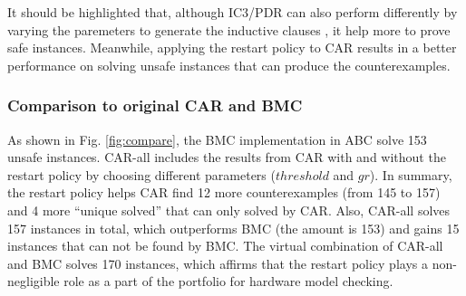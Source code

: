 It should be highlighted that, although IC3/PDR can also perform differently by varying the paremeters to generate the inductive clauses \cite{}, it help more to prove safe instances. Meanwhile, applying the restart policy to CAR results in a better performance on solving unsafe instances that can produce the counterexamples. 

\subsubsection{Comparison to original CAR and BMC }
As shown in Fig. \ref{fig:compare}, the BMC implementation in ABC solve 153 unsafe instances. CAR-all includes the results from CAR with and without the restart policy by choosing different parameters ($threshold$ and $gr$). In summary, the restart policy helps CAR find 12 more counterexamples (from 145 to 157) and 4 more ``unique solved'' that can only solved by CAR. Also, CAR-all solves 157 instances in total, which outperforms BMC (the amount is 153) and gains 15 instances that can not be found by BMC. The virtual combination of CAR-all and BMC  solves 170 instances, which affirms that the restart policy plays a non-negligible role as a part of the portfolio for hardware model checking.

